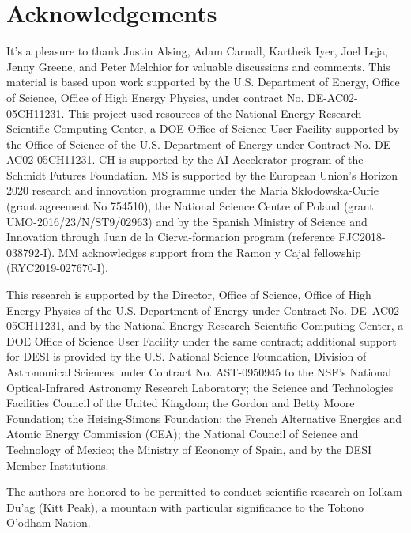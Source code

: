 \documentclass[12pt, letterpaper, preprint]{aastex63}
\begin{document}
\section*{Acknowledgements}
It's a pleasure to thank
    Justin Alsing, 
    Adam Carnall, 
    Kartheik Iyer, 
    Joel Leja, 
    Jenny Greene, 
    and 
    Peter Melchior
for valuable discussions and comments. 
This material is based upon work supported by the U.S. Department of Energy,
Office of Science, Office of High Energy Physics, under contract No.
DE-AC02-05CH11231.  This project used resources of the National Energy Research
Scientific Computing Center, a DOE Office of Science User Facility supported by
the Office of Science of the U.S.  Department of Energy under Contract No.
DE-AC02-05CH11231. 
CH is supported by the AI Accelerator program of the Schmidt Futures Foundation.
MS is supported by the European Union's  Horizon 2020 research and innovation
programme under the Maria Sk\l{}odowska-Curie (grant agreement No 754510), the
National Science Centre of Poland (grant UMO-2016/23/N/ST9/02963) and by the
Spanish Ministry of Science and Innovation through Juan de la Cierva-formacion
program (reference FJC2018-038792-I).
MM acknowledges support from the Ramon y Cajal fellowship (RYC2019-027670-I).

This research is supported by the Director, Office of Science, Office of High
Energy Physics of the U.S. Department of Energy under Contract No.
DE–AC02–05CH11231, and by the National Energy Research Scientific Computing
Center, a DOE Office of Science User Facility under the same contract;
additional support for DESI is provided by the U.S. National Science
Foundation, Division of Astronomical Sciences under Contract No. AST-0950945 to
the NSF’s National Optical-Infrared Astronomy Research Laboratory; the Science
and Technologies Facilities Council of the United Kingdom; the Gordon and Betty
Moore Foundation; the Heising-Simons Foundation; the French Alternative
Energies and Atomic Energy Commission (CEA); the National Council of Science
and Technology of Mexico; the Ministry of Economy of Spain, and by the DESI
Member Institutions.

The authors are honored to be permitted to conduct scientific research on
Iolkam Du’ag (Kitt Peak), a mountain with particular significance to the Tohono
O’odham Nation.


\appendix





 
\end{document}
